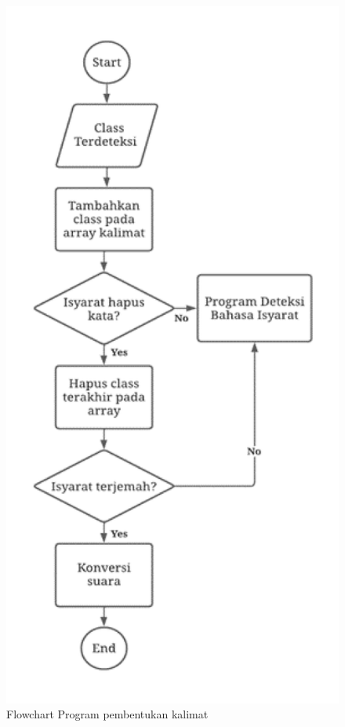 \begin{figure}[H]
  \centering

  \includegraphics[scale=0.35]{gambar/bab3-flowchart-kalimat.png}

  \caption{Flowchart Program pembentukan kalimat}
  \label{fig:flowchartkalimat}
\end{figure}


